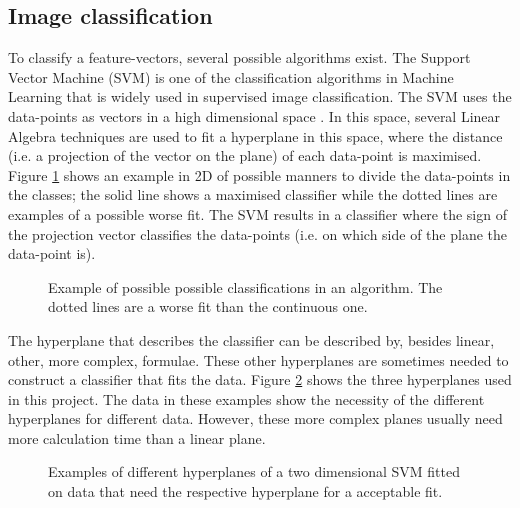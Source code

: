 \subsection{Image classification}
\label{sec:Theory-class}
To classify a feature-vectors, several possible algorithms exist.
The Support Vector Machine (SVM) is one of the classification algorithms in Machine Learning that is widely used in supervised image classification.
The SVM uses the data-points as vectors in a high dimensional space \citep{boser1992training}.
In this space, several Linear Algebra techniques are used to fit a hyperplane in this space, where the distance (i.e. a projection of the vector on the plane) of each data-point is maximised.
Figure \ref{fig:svm-fits} shows an example in 2D of possible manners to divide the data-points in the classes; the solid line shows a maximised classifier while the dotted lines are examples of a possible worse fit.
The SVM results in a classifier where the sign of the projection vector classifies the data-points (i.e. on which side of the plane the data-point is).

\begin{figure}%
\centering
\ifx\showfig\undefined
 \fi
\captionsetup{width=.8\textwidth}
\caption{Example of possible possible classifications in an algorithm. The dotted lines are a worse fit than the continuous one.}
\label{fig:svm-fits}
\end{figure}

The hyperplane that describes the classifier can be described by, besides linear, other, more complex, formulae.
These other hyperplanes are sometimes needed to construct a classifier that fits the data. Figure \ref{fig:svm-planes} shows the three hyperplanes used in this project.
The data in these examples show the necessity of the different hyperplanes for different data.
However, these more complex planes usually need more calculation time than a linear plane.

\begin{figure}%
\centering
\ifx\showfig\undefined
 \fi
\caption{Examples of different hyperplanes of a two dimensional SVM fitted on data that need the respective hyperplane for a acceptable fit.}
\label{fig:svm-planes}
\end{figure}
